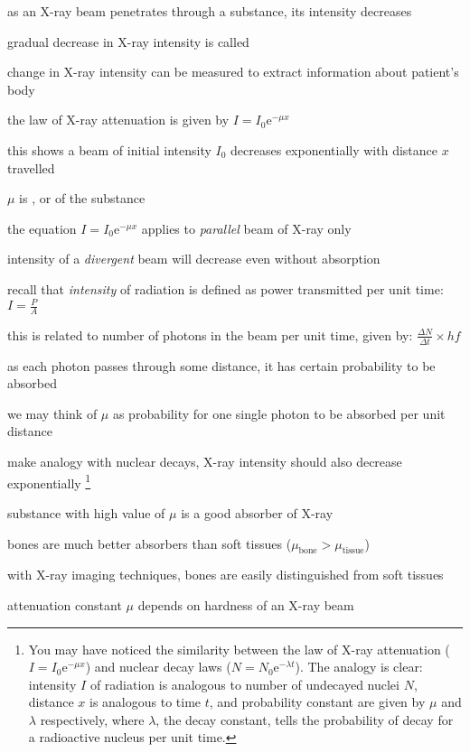 as an X-ray beam penetrates through a substance, its intensity decreases

gradual decrease in X-ray intensity is called 

change in X-ray intensity can be measured to extract information about patient's body

the law of X-ray attenuation is given by $\boxed{I = I_0 \mathrm{e}^{-\mu x}}$

this shows a beam of initial intensity $I_0$ decreases exponentially with distance $x$ travelled

$\mu$ is , or  of the substance

\cmt the equation $I = I_0 \mathrm{e}^{-\mu x}$ applies to \emph{parallel} beam of X-ray only

intensity of a \emph{divergent} beam will decrease even without absorption

\cmt recall that \emph{intensity} of radiation is defined as power transmitted per unit time: $I = \frac{P}{A}$

this is related to number of photons in the beam per unit time, given by: $\frac{\Delta N}{\Delta t} \times hf$

as each photon passes through some distance, it has certain probability to be absorbed

we may think of $\mu$ as probability for one single photon to be absorbed per unit distance

make analogy with nuclear decays, X-ray intensity should also decrease exponentially
\footnote{You may have noticed the similarity between the law of X-ray attenuation ($I = I_0 \mathrm{e}^{-\mu x}$) and nuclear decay laws ($N=N_0 \mathrm{e}^{-\lambda t}$). The analogy is clear: intensity $I$ of radiation is analogous to number of undecayed nuclei $N$, distance $x$ is analogous to time $t$, and probability constant are given by $\mu$ and $\lambda$ respectively, where $\lambda$, the decay constant, tells the probability of decay for a radioactive nucleus per unit time.}

\cmt substance with high value of $\mu$ is a good absorber of X-ray

bones are much better absorbers than soft tissues ($\mu_\text{bone}>\mu_\text{tissue}$)

with X-ray imaging techniques, bones are easily distinguished from soft tissues

\cmt attenuation constant $\mu$ depends on hardness of an X-ray beam

